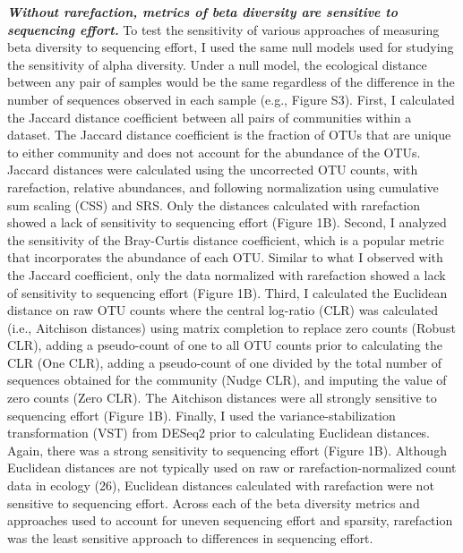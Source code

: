 \documentclass[
]{article}
\begin{document}
\textbf{\emph{Without rarefaction, metrics of beta diversity are
sensitive to sequencing effort.}} To test the sensitivity of various
approaches of measuring beta diversity to sequencing effort, I used the
same null models used for studying the sensitivity of alpha diversity.
Under a null model, the ecological distance between any pair of samples
would be the same regardless of the difference in the number of
sequences observed in each sample (e.g., Figure S3). First, I calculated
the Jaccard distance coefficient between all pairs of communities within
a dataset. The Jaccard distance coefficient is the fraction of OTUs that
are unique to either community and does not account for the abundance of
the OTUs. Jaccard distances were calculated using the uncorrected OTU
counts, with rarefaction, relative abundances, and following
normalization using cumulative sum scaling (CSS) and SRS. Only the
distances calculated with rarefaction showed a lack of sensitivity to
sequencing effort (Figure 1B). Second, I analyzed the sensitivity of the
Bray-Curtis distance coefficient, which is a popular metric that
incorporates the abundance of each OTU. Similar to what I observed with
the Jaccard coefficient, only the data normalized with rarefaction
showed a lack of sensitivity to sequencing effort (Figure 1B). Third, I
calculated the Euclidean distance on raw OTU counts where the central
log-ratio (CLR) was calculated (i.e., Aitchison distances) using matrix
completion to replace zero counts (Robust CLR), adding a pseudo-count of
one to all OTU counts prior to calculating the CLR (One CLR), adding a
pseudo-count of one divided by the total number of sequences obtained
for the community (Nudge CLR), and imputing the value of zero counts
(Zero CLR). The Aitchison distances were all strongly sensitive to
sequencing effort (Figure 1B). Finally, I used the
variance-stabilization transformation (VST) from DESeq2 prior to
calculating Euclidean distances. Again, there was a strong sensitivity
to sequencing effort (Figure 1B). Although Euclidean distances are not
typically used on raw or rarefaction-normalized count data in ecology
(26), Euclidean distances calculated with rarefaction were not sensitive
to sequencing effort. Across each of the beta diversity metrics and
approaches used to account for uneven sequencing effort and sparsity,
rarefaction was the least sensitive approach to differences in
sequencing effort.
\end{document}
